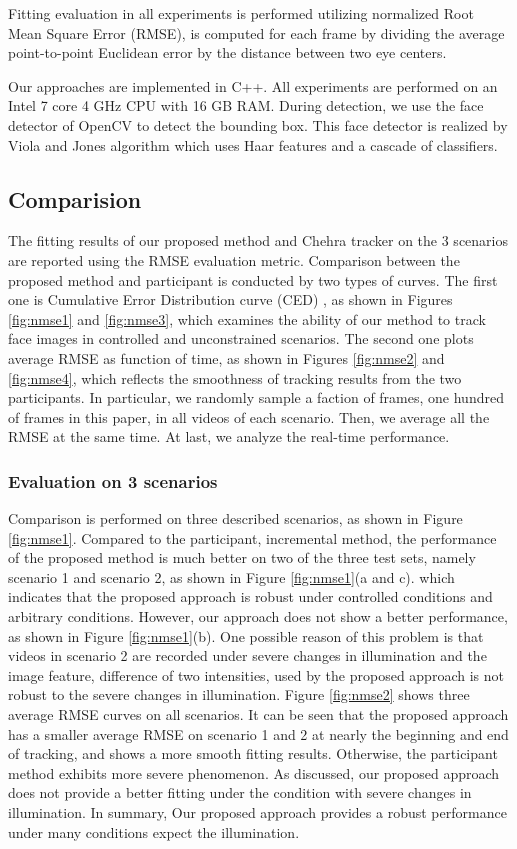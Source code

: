 \documentclass[a4paper, 10pt, conference]{ieeeconf}      %
\begin{document}
Fitting evaluation in all experiments is performed utilizing normalized Root Mean Square Error (RMSE), is computed for each frame by 
dividing the average point-to-point Euclidean error by the distance between two eye centers.

Our approaches are implemented in C++. All experiments are performed on an Intel 7 core 4 GHz CPU with 16 GB RAM. During detection, we 
use the face detector of OpenCV to detect the bounding box. This face detector is realized by Viola and Jones algorithm which uses 
Haar features and a cascade of classifiers.
\subsection{Comparision}
The fitting results of our proposed method and Chehra tracker on the 3 scenarios are reported using the RMSE evaluation metric. Comparison 
between the proposed method and participant is conducted by two types of curves. The first one is Cumulative Error Distribution curve (CED) 
, as shown in Figures \ref{fig:nmse1} and \ref{fig:nmse3}, which examines the ability of our method to track face images in controlled and unconstrained scenarios. 
The second one plots average RMSE as function of time, as shown in Figures \ref{fig:nmse2} and \ref{fig:nmse4}, which reflects the smoothness of tracking results from the two 
participants. In particular, we randomly sample a faction of frames, one hundred of frames in this paper, in all videos of each scenario. Then, 
we average all the RMSE at the same time. At last, we analyze the real-time performance.
\subsubsection{Evaluation on 3 scenarios}
Comparison is performed on three described scenarios, as shown in Figure \ref{fig:nmse1}. Compared to the participant, incremental method,
the performance of the proposed method is much better on two of
the three test sets, namely scenario 1 and scenario 2, as shown in Figure \ref{fig:nmse1}(a and c). 
which indicates that the proposed approach is robust under controlled conditions and arbitrary conditions.
However, our approach does not show a better performance, as shown in Figure \ref{fig:nmse1}(b). One possible reason of this problem is
that videos in 
scenario 2 are recorded under severe changes in illumination and the image feature, difference of two intensities, used by the proposed approach is 
not robust to the severe changes in illumination. Figure \ref{fig:nmse2} shows three average RMSE curves on all scenarios. It can be seen that the proposed approach
has a smaller average RMSE on scenario 1 and 2 at nearly the beginning and end of tracking, and shows a more smooth fitting results.
Otherwise, the participant method exhibits more severe phenomenon. As discussed, our proposed approach does not provide a better fitting under the 
condition with severe changes in illumination. In summary, Our proposed approach provides a robust performance under many conditions expect the 
illumination.
\end{document}

